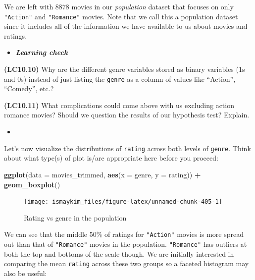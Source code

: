 \documentclass[12pt, krantz2,]{krantz}
\makeatletter
\newenvironment{Shaded}{\begin{snugshade}}{\end{snugshade}}
\newcommand{\DataTypeTok}[1]{\textcolor[rgb]{0.27,0.27,0.27}{#1}}
\newcommand{\KeywordTok}[1]{\textcolor[rgb]{0.27,0.27,0.27}{\textbf{#1}}}
\newcommand{\NormalTok}[1]{#1}
\newcommand{\OperatorTok}[1]{\textcolor[rgb]{0.43,0.43,0.43}{\textbf{#1}}}
\newcommand{\StringTok}[1]{\textcolor[rgb]{0.5,0.5,0.5}{#1}}
\newenvironment{kframe}{%
\medskip{}
\setlength{\fboxsep}{.8em}
 \def\at@end@of@kframe{}%
 \ifinner\ifhmode%
  \def\at@end@of@kframe{\end{minipage}}%
  \begin{minipage}{\columnwidth}%
 \fi\fi%
 \def\FrameCommand##1{\hskip\@totalleftmargin \hskip-\fboxsep
 \colorbox{shadecolor}{##1}\hskip-\fboxsep
     \hskip-\linewidth \hskip-\@totalleftmargin \hskip\columnwidth}%
 \MakeFramed {\advance\hsize-\width
   \@totalleftmargin\z@ \linewidth\hsize
   \@setminipage}}%
 {\par\unskip\endMakeFramed%
 \at@end@of@kframe}
\renewenvironment{Shaded}{\begin{kframe}}{\end{kframe}}
\newenvironment{rmdblock}[1]
  {\begin{shaded*}
  \begin{itemize}
  \renewcommand{\labelitemi}{
    \raisebox{-.7\height}[0pt][0pt]{
    }
  }
  \item
  }
  {
  \end{itemize}
  \end{shaded*}
  }
\newenvironment{learncheck}
  {\begin{rmdblock}{warning}}
  {\end{rmdblock}}
\makeatother
\begin{document}
We are left with 8878 movies in our \emph{population} dataset that focuses on only \texttt{"Action"} and \texttt{"Romance"} movies. Note that we call this a population dataset since it includes all of the information we have available to us about movies and ratings.

\begin{learncheck}
\textbf{\emph{Learning check}}
\end{learncheck}

\textbf{(LC10.10)} Why are the different genre variables stored as binary variables (1s and 0s) instead of just listing the \texttt{genre} as a column of values like ``Action'', ``Comedy'', etc.?

\textbf{(LC10.11)} What complications could come above with us excluding action romance movies? Should we question the results of our hypothesis test? Explain.

\begin{learncheck}

\end{learncheck}

Let's now visualize the distributions of \texttt{rating} across both levels of \texttt{genre}. Think about what type(s) of plot is/are appropriate here before you proceed:

\begin{Shaded}
\begin{Highlighting}[]
\KeywordTok{ggplot}\NormalTok{(}\DataTypeTok{data =}\NormalTok{ movies_trimmed, }\KeywordTok{aes}\NormalTok{(}\DataTypeTok{x =}\NormalTok{ genre, }\DataTypeTok{y =}\NormalTok{ rating)) }\OperatorTok{+}
\StringTok{  }\KeywordTok{geom_boxplot}\NormalTok{()}
\end{Highlighting}
\end{Shaded}

\begin{figure}

{\centering \texttt{[image: ismaykim\_files/figure-latex/unnamed-chunk-405-1]} 

}

\caption{Rating vs genre in the population}\label{fig:unnamed-chunk-405}
\end{figure}

We can see that the middle 50\% of ratings for \texttt{"Action"} movies is more spread out than that of \texttt{"Romance"} movies in the population. \texttt{"Romance"} has outliers at both the top and bottoms of the scale though. We are initially interested in comparing the mean \texttt{rating} across these two groups so a faceted histogram may also be useful:
\end{document}
